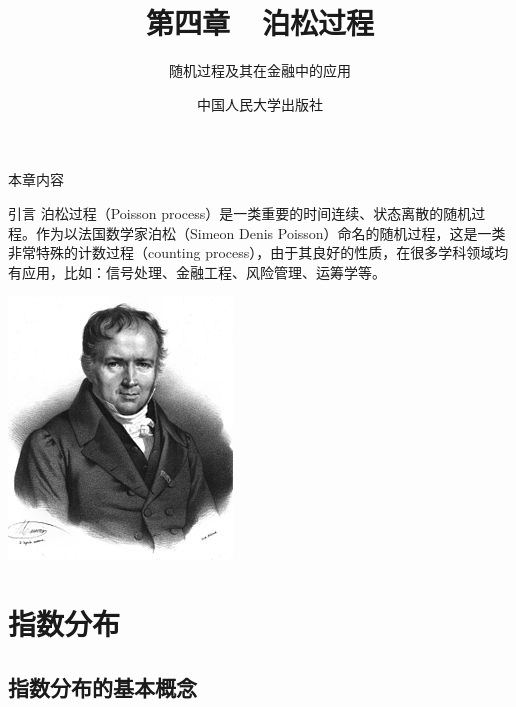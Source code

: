 \documentclass[t]{beamer}
\begin{document}
\fontsize{11}{18}\selectfont


\CTEXindent



  \title{第四章~~泊松过程}
\author{随机过程及其在金融中的应用}
\date{中国人民大学出版社}
  \begin{frame}
    \maketitle
  \end{frame}

\begin{frame}{本章内容}
  \begin{multicols}{2}
    \tableofcontents
  \end{multicols}
\end{frame}

\begin{frame}{引言}
    泊松过程（Poisson process）是一类重要的时间连续、状态离散的随机过程。作为以法国数学家泊松（Simeon Denis Poisson）命名的随机过程，这是一类非常特殊的计数过程（counting process），由于其良好的性质，在很多学科领域均有应用，比如：信号处理、金融工程、风险管理、运筹学等。
    
\begin{center}
\includegraphics[height=.45\textheight]{fig/poisson.jpg}
\end{center}

\end{frame}


\section{指数分布}
\subsection{指数分布的基本概念}
\end{document}
